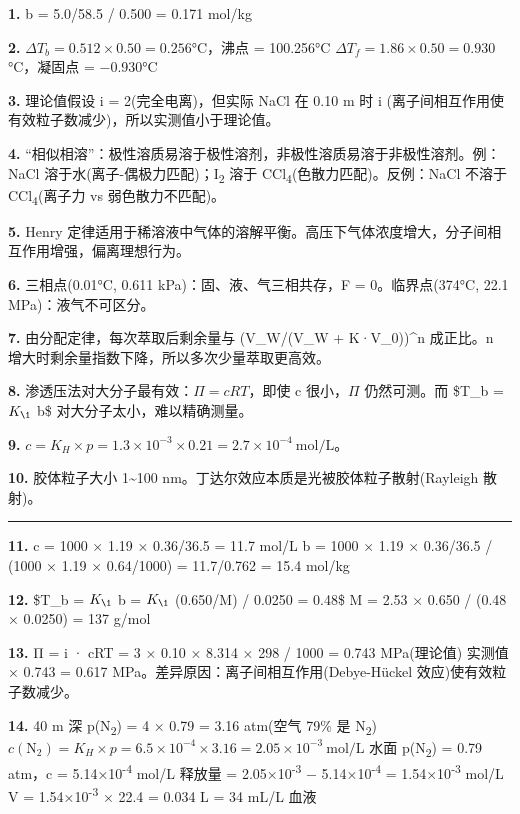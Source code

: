 \textbf{1.} b = 5.0/58.5 / 0.500 = 0.171 mol/kg

\textbf{2.} \(\Delta T_b = 0.512 \times 0.50 = 0.256\)°C，沸点 = 100.256°C
\(\Delta T_f = 1.86 \times 0.50 = 0.930\)°C，凝固点 = −0.930°C

\textbf{3.} 理论值假设 i = 2(完全电离)，但实际 NaCl 在 0.10 m 时 i (离子间相互作用使有效粒子数减少)，所以实测值小于理论值。

\textbf{4.} ``相似相溶''：极性溶质易溶于极性溶剂，非极性溶质易溶于非极性溶剂。例：NaCl 溶于水(离子-偶极力匹配)；I\textsubscript{2} 溶于 CCl\textsubscript{4}(色散力匹配)。反例：NaCl 不溶于 CCl\textsubscript{4}(离子力 vs 弱色散力不匹配)。

\textbf{5.} Henry 定律适用于稀溶液中气体的溶解平衡。高压下气体浓度增大，分子间相互作用增强，偏离理想行为。

\textbf{6.} 三相点(0.01°C, 0.611 kPa)：固、液、气三相共存，F = 0。临界点(374°C, 22.1 MPa)：液气不可区分。

\textbf{7.} 由分配定律，每次萃取后剩余量与 (V\_W/(V\_W + K·V\_0))\^{}n 成正比。n 增大时剩余量指数下降，所以多次少量萃取更高效。

\textbf{8.} 渗透压法对大分子最有效：\(\Pi = cRT\)，即使 c 很小，\(\Pi\) 仍然可测。而 \$\Delta T\_b = \(K_{\1}\) \cdot b\$ 对大分子太小，难以精确测量。

\textbf{9.} \(c = K_H \times p = 1.3 \times 10^{-3} \times 0.21 = 2.7 \times 10^{-4}\ \mathrm{mol/L}\)。

\textbf{10.} 胶体粒子大小 1\textasciitilde100 nm。丁达尔效应本质是光被胶体粒子散射(Rayleigh 散射)。

\begin{center}\rule{0.5\linewidth}{0.5pt}\end{center}

\textbf{11.} c = 1000 × 1.19 × 0.36/36.5 = 11.7 mol/L
b = 1000 × 1.19 × 0.36/36.5 / (1000 × 1.19 × 0.64/1000) = 11.7/0.762 = 15.4 mol/kg

\textbf{12.} \$\Delta T\_b = \(K_{\1}\) \cdot b = \(K_{\1}\) \cdot (0.650/M) / 0.0250 = 0.48\$
M = 2.53 × 0.650 / (0.48 × 0.0250) = 137 g/mol

\textbf{13.} Π = i · cRT = 3 × 0.10 × 8.314 × 298 / 1000 = 0.743 MPa(理论值)
实测值  × 0.743 = 0.617 MPa。差异原因：离子间相互作用(Debye-Hückel 效应)使有效粒子数减少。

\textbf{14.} 40 m 深 p(N\textsubscript{2}) = 4 × 0.79 = 3.16 atm(空气 79\% 是 N\textsubscript{2})
\(c(\mathrm{N_2}) = K_H \times p = 6.5 \times 10^{-4} \times 3.16 = 2.05 \times 10^{-3}\ \mathrm{mol/L}\)
水面 p(N\textsubscript{2}) = 0.79 atm，c = 5.14×10\textsuperscript{-4} mol/L
释放量 = 2.05×10\textsuperscript{-3} − 5.14×10\textsuperscript{-4} = 1.54×10\textsuperscript{-3} mol/L
V = 1.54×10\textsuperscript{-3} × 22.4 = 0.034 L = 34 mL/L 血液

